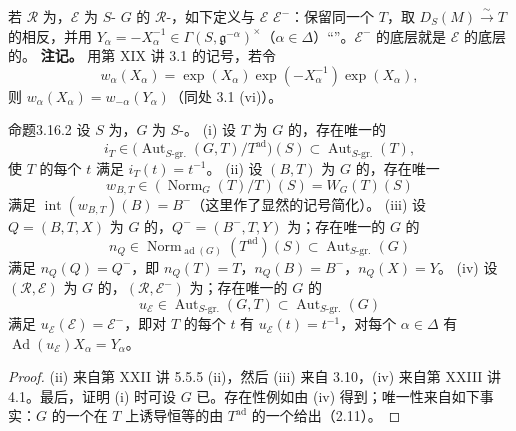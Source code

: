 若 $\mathcal R$ 为，$\mathcal E$ 为 $S$- $G$ 的 $\mathcal R$-，如下定义与 $\mathcal E$  $\mathcal E^-$：保留同一个 $T$，取 $D_S(M)\xrightarrow\sim T$ 的相反，并用 $Y_\alpha=-X_\alpha^{-1}\in\Gamma(S,\mathfrak g^{-\alpha})^\times$（$\alpha\in\Delta$）“”。$\mathcal E^-$ 的底层就是 $\mathcal E$ 的底层的。
\textbf{注记。} 用第 XIX 讲 3.1 的记号，若令
\[w_\alpha(X_\alpha)=\exp(X_\alpha)\exp(-X_\alpha^{-1})\exp(X_\alpha),\]
则 $w_\alpha(X_\alpha)=w_{-\alpha}(Y_\alpha)$（同处 3.1 (vi)）。
\begin{SGAresult}{命题}{3.16.2}
设 $S$ 为，$G$ 为 $S$-。
(i) 设 $T$ 为 $G$ 的，存在唯一的
\[i_T\in\bigl(\operatorname{Aut}_{S\text{-gr.}}(G,T)/T^{\mathrm{ad}}\bigr)(S)\subset\operatorname{Aut}_{S\text{-gr.}}(T),\]
使 $T$ 的每个 $t$ 满足 $i_T(t)=t^{-1}$。
(ii) 设 $(B,T)$ 为 $G$ 的，存在唯一
\[w_{B,T}\in(\operatorname{Norm}_G(T)/T)(S)=W_G(T)(S)\]
满足 $\operatorname{int}(w_{B,T})(B)=B^-$（这里作了显然的记号简化）。
(iii) 设 $Q=(B,T,X)$ 为 $G$ 的，$Q^-=(B^-,T,Y)$ 为；存在唯一的 $G$ 的
\[n_Q\in\operatorname{Norm}_{\operatorname{ad}(G)}(T^{\mathrm{ad}})(S)\subset\operatorname{Aut}_{S\text{-gr.}}(G)\]
满足 $n_Q(Q)=Q^-$，即 $n_Q(T)=T$，$n_Q(B)=B^-$，$n_Q(X)=Y$。
(iv) 设 $(\mathcal R,\mathcal E)$ 为 $G$ 的，$(\mathcal R,\mathcal E^-)$ 为；存在唯一的 $G$ 的
\[u_{\mathcal E}\in\operatorname{Aut}_{S\text{-gr.}}(G,T)\subset\operatorname{Aut}_{S\text{-gr.}}(G)\]
满足 $u_{\mathcal E}(\mathcal E)=\mathcal E^-$，即对 $T$ 的每个 $t$ 有 $u_{\mathcal E}(t)=t^{-1}$，对每个 $\alpha\in\Delta$ 有 $\operatorname{Ad}(u_{\mathcal E})X_\alpha=Y_\alpha$。
\end{SGAresult}
\begin{proof}
(ii) 来自第 XXII 讲 5.5.5 (ii)，然后 (iii) 来自 3.10，(iv) 来自第 XXIII 讲 4.1。最后，证明 (i) 时可设 $G$ 已。存在性例如由 (iv) 得到；唯一性来自如下事实：$G$ 的一个在 $T$ 上诱导恒等的由 $T^{\mathrm{ad}}$ 的一个给出（2.11）。
\end{proof}
